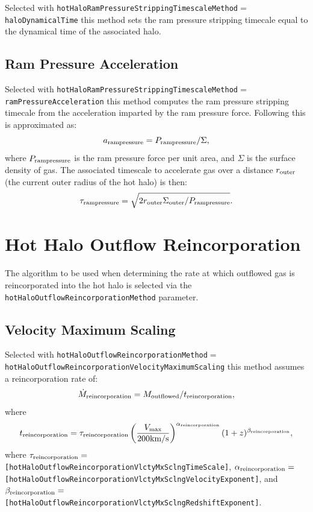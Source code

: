 Selected with {\tt hotHaloRamPressureStrippingTimescaleMethod}$=${\tt haloDynamicalTime} this method sets the ram pressure stripping timecale equal to the dynamical time of the associated halo.

\subsection{Ram Pressure Acceleration}

Selected with {\tt hotHaloRamPressureStrippingTimescaleMethod}$=${\tt ramPressureAcceleration} this method computes the ram pressure stripping timecale from the acceleration imparted by the ram pressure force. Following \cite{roediger_ram_2007} this is approximated as:
\begin{equation}
 a_{\rm ram pressure} = P_{\rm ram pressure}/\Sigma,
\end{equation}
where $P_{\rm ram pressure}$ is the ram pressure force per unit area, and $\Sigma$ is the surface density of gas. The associated timescale to accelerate gas over a distance $r_{\rm outer}$ (the current outer radius of the hot halo) is then:
\begin{equation}
 \tau_{\rm ram pressure} = \sqrt{2 r_{\rm outer} \Sigma_{\rm outer} / P_{\rm ram pressure}}.
\end{equation}

\section{Hot Halo Outflow Reincorporation}\label{phys:hotHaloOutflowReincorporation}

The algorithm to be used when determining the rate at which outflowed gas is reincorporated into the hot halo is selected via the {\tt hotHaloOutflowReincorporationMethod} parameter.

\subsection{Velocity Maximum Scaling}\label{phys:hotHaloOutflowReincorporation:hotHaloOutflowReincorporationVelocityMaximumScaling}

Selected with {\tt hotHaloOutflowReincorporationMethod}$=${\tt hotHaloOutflowReincorporationVelocityMaximumScaling} this method assumes a reincorporation rate of:
\begin{equation}
 \dot{M}_{\rm reincorporation} = M_{\rm outflowed} / t_{\rm reincorporation},
\end{equation}
where
\begin{equation}
 t_{\rm reincorporation} = \tau_{\rm reincorporation} \left( { V_{\rm max} \over 200 \hbox{km/s}} \right)^{\alpha_{\rm reincorporation}} (1+z)^{\beta_{\rm reincorporation}},
\end{equation}
where $\tau_{\rm reincorporation}=${\tt [hotHaloOutflowReincorporationVlctyMxSclngTimeScale]}, $\alpha_{\rm reincorporation}=${\tt [hotHaloOutflowReincorporationVlctyMxSclngVelocityExponent]}, and $\beta_{\rm reincorporation}=${\tt [hotHaloOutflowReincorporationVlctyMxSclngRedshiftExponent]}.

